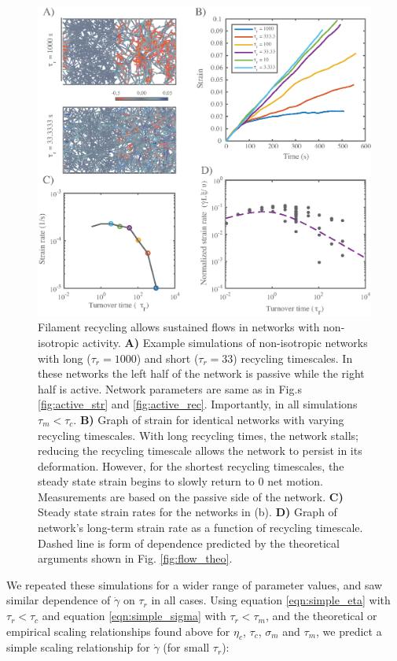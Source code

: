 \begin{figure}[H]
	\centering
	\includegraphics[width=\hsize]{active/figures/Fig9}
	\caption{\label{fig:flow_ex}  Filament recycling allows sustained flows in networks with non-isotropic activity. \textbf{A)} Example simulations of non-isotropic networks with long ($\tau_r=1000$) and short ($\tau_r=33$) recycling timescales. In these networks the left half of the network is passive while the right half is active.  Network parameters are same as in Fig.s \ref{fig:active_str} and \ref{fig:active_rec}. Importantly, in all simulations $\tau_{m}<\tau_c$. \textbf{B)} Graph of strain for identical networks with varying recycling timescales.  With long recycling times, the network stalls; reducing the recycling timescale allows the network to persist in its deformation.  However, for the shortest recycling timescales, the steady state strain begins to slowly return to 0 net motion.  Measurements are based on the passive side of the network. \textbf{C)} Steady state strain rates for the networks in (b).     \textbf{D)} Graph of network's long-term strain rate as a function of recycling timescale. Dashed line is form of dependence predicted by the  theoretical arguments shown in Fig. \ref{fig:flow_theo}.}
\end{figure}

We repeated these simulations for a wider range of parameter values, and saw similar dependence of $\dot{\gamma}$ on $\tau_r$ in all cases.  Using equation \ref{eqn:simple_eta} with $\tau_r < \tau_c$ and equation \ref{eqn:simple_sigma} with $\tau_r < \tau_m$, and the theoretical or empirical scaling relationships found above for $\eta_c$, $\tau_c$, $\sigma_m$ and $\tau_m$, we predict a simple scaling relationship for $\dot{\gamma}$ (for small $\tau_r$):


